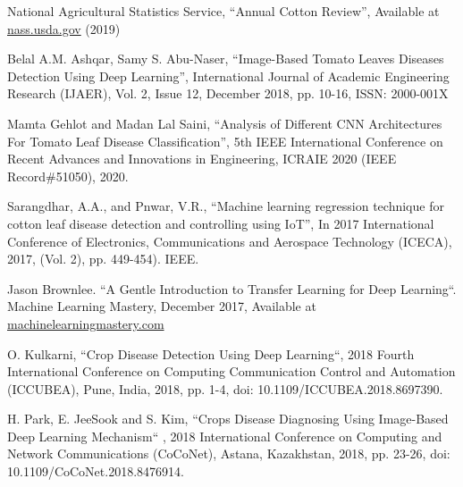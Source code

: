 \documentclass[conference]{IEEEtran}
\begin{document}
%

    
\begin{thebibliography}{00}

 National Agricultural Statistics Service, ``Annual Cotton Review'', Available at \href{https://www.nass.usda.gov/Statistics_by_State/Texas/Publications/Current_News_Release/2020_Rls/tx-cotton-review-2020.pdf}{nass.usda.gov}  (2019)


 Belal A.M. Ashqar, Samy S. Abu-Naser, ``Image-Based Tomato Leaves Diseases Detection Using Deep Learning'', International Journal of Academic Engineering Research (IJAER), Vol. 2, Issue 12, December 2018, pp. 10-16, ISSN: 2000-001X

 Mamta Gehlot and Madan Lal Saini, ``Analysis of Different CNN Architectures For Tomato Leaf Disease Classification'', 5th IEEE International Conference on Recent Advances and Innovations in Engineering, ICRAIE 2020 (IEEE Record\#51050), 2020. 

 Sarangdhar, A.A., and Pnwar, V.R., ``Machine learning regression technique for cotton leaf disease detection and controlling using IoT'', In 2017 International Conference of Electronics, Communications and Aerospace Technology (ICECA), 2017, (Vol. 2), pp. 449-454). IEEE.

 Jason Brownlee. ``A Gentle Introduction to Transfer Learning for Deep Learning``. Machine Learning Mastery, December 2017, Available at \href{https://machinelearningmastery.com/transfer-learning-for-deep-learning/#:~:text=Transfer\%20learning\%20is\%20a\%20machine,model\%20on\%20a\%20second\%20task.&text=Common\%20examples\%20of\%20transfer\%20learning,your\%20own\%20predictive\%20modeling\%20problems.}{machinelearningmastery.com}

 O. Kulkarni, ``Crop Disease Detection Using Deep Learning``, 2018 Fourth International Conference on Computing Communication Control and Automation (ICCUBEA), Pune, India, 2018, pp. 1-4, doi: 10.1109/ICCUBEA.2018.8697390.

 H. Park, E. JeeSook and S. Kim, ``Crops Disease Diagnosing Using Image-Based Deep Learning Mechanism`` , 2018 International Conference on Computing and Network Communications (CoCoNet), Astana, Kazakhstan, 2018, pp. 23-26, doi: 10.1109/CoCoNet.2018.8476914.


\end{thebibliography}
\end{document}
